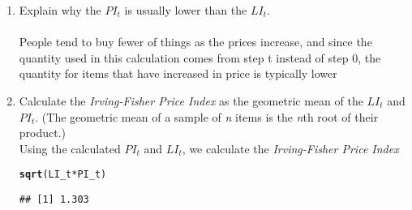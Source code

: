 \documentclass{article}\usepackage[]{graphicx}\usepackage[]{color}
\makeatletter
\newcommand{\hlopt}[1]{\textcolor[rgb]{0,0,0}{#1}}%
\newcommand{\hlstd}[1]{\textcolor[rgb]{0.345,0.345,0.345}{#1}}%
\newcommand{\hlkwd}[1]{\textcolor[rgb]{0.737,0.353,0.396}{\textbf{#1}}}%
\newenvironment{kframe}{%
 \def\at@end@of@kframe{}%
 \ifinner\ifhmode%
  \def\at@end@of@kframe{\end{minipage}}%
  \begin{minipage}{\columnwidth}%
 \fi\fi%
 \def\FrameCommand##1{\hskip\@totalleftmargin \hskip-\fboxsep
 \colorbox{shadecolor}{##1}\hskip-\fboxsep
     \hskip-\linewidth \hskip-\@totalleftmargin \hskip\columnwidth}%
 \MakeFramed {\advance\hsize-\width
   \@totalleftmargin\z@ \linewidth\hsize
   \@setminipage}}%
 {\par\unskip\endMakeFramed%
 \at@end@of@kframe}
\newenvironment{knitrout}{}{} %
\makeatother
\begin{document}
\begin{enumerate}
\begin{enumerate}
\item Explain why the $PI_t$ is usually lower than the $LI_t$. 
\\ \\
People tend to buy fewer of things as the prices increase, and since the quantity used in this calculation comes from step t instead of step 0, the quantity for items that have increased in price is typically lower
\\
\item Calculate the \textit{Irving-Fisher Price Index} as the geometric mean of the $LI_t$ and $PI_t$. (The geometric mean of a sample of \textit{n} items is the \textit{n}th root of their product.)
\\
Using the calculated $PI_t$ and $LI_t$, we calculate the \textit{Irving-Fisher Price Index}
\begin{knitrout}
\color{fgcolor}\begin{kframe}
\begin{alltt}
\hlkwd{sqrt}\hlstd{(LI_t} \hlopt{*} \hlstd{PI_t)}
\end{alltt}
\begin{verbatim}
## [1] 1.303
\end{verbatim}
\end{kframe}
\end{knitrout}

\end{enumerate}
\end{enumerate}
\end{document}
